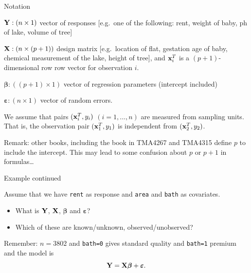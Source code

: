 \documentclass[10pt,ignorenonframetext,]{beamer}
\providecommand{\tightlist}{%
  \setlength{\itemsep}{0pt}\setlength{\parskip}{0pt}}
\begin{document}
\begin{frame}

\begin{block}{Notation}

\({\bf Y}: (n \times 1)\) vector of responses {[}e.g.~one of the
following: rent, weight of baby, ph of lake, volume of tree{]}

\({\bf X}: (n \times (p+1))\) design matrix {[}e.g.~location of flat,
gestation age of baby, chemical measurement of the lake, height of
tree{]}, and \({\bf x}_i^T\) is a \((p+1)\)-dimensional row row vector
for observation \(i\).

\({\boldsymbol \beta}: ((p+1) \times 1)\) vector of regression
parameters (intercept included)

\({\boldsymbol \varepsilon}: (n\times 1)\) vector of random errors.

We assume that pairs \(({\bf x}_i^T,y_i)\) \((i=1,...,n)\) are measured
from sampling units. That is, the observation pair \(({\bf x}_1^T,y_1)\)
is independent from \(({\bf x}_2^T,y_2)\).

Remark: other books, including the book in TMA4267 and TMA4315 define
\(p\) to include the intercept. This may lead to some confusion about
\(p\) or \(p+1\) in formulas\ldots{}

\end{block}

\end{frame}

\begin{frame}[fragile]

\begin{block}{Example continued}

Assume that we have \texttt{rent} as response and \texttt{area} and
\texttt{bath} as covariates.

\begin{itemize}
\tightlist
\item
  What is \({\bf Y}\), \({\bf X}\), \(\boldsymbol{\beta}\) and
  \(\boldsymbol{\varepsilon}\)?
\item
  Which of these are known/unknown, observed/unobserved?
\end{itemize}

Remember: \(n=3802\) and \texttt{bath=0} gives standard quality and
\texttt{bath=1} premium and the model is
\[{\bf Y=X \boldsymbol\beta}+{\boldsymbol \varepsilon}.\]

\end{block}

\end{frame}
\end{document}
